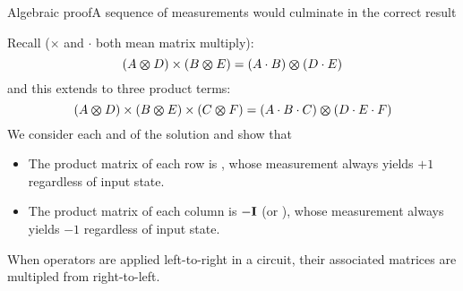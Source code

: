 \begin{frame}{Algebraic proof}{A sequence of measurements would culminate in the correct result}

Recall ($\times$ and $\cdot$ both mean matrix multiply):
\[ (A \bm{\otimes}{} D) \times (B \bm{\otimes}{} E) = (A\cdot B) \bm{\otimes}{} (D\cdot E) \]
and this extends to three product terms:
\[
(A \bm{\otimes}{} D) \times (B \bm{\otimes}{} E) \times (C \bm{\otimes}{} F) = (A\cdot B\cdot C) \bm{\otimes}{} (D\cdot E\cdot F)
\]
We consider each  and  of the solution and show that
\begin{itemize}
    \item The product matrix of each row is \Identity, whose measurement always yields $+1$ regardless of input state.
    \item The product matrix of each column is $-\mbox{\bfseries{\textrm{I}}}$ (or \Not{\Identity}), whose measurement always yields $-1$ regardless of input state.
\end{itemize}
When operators are applied left-to-right in a circuit, their associated matrices are multipled from right-to-left.

\end{frame}

